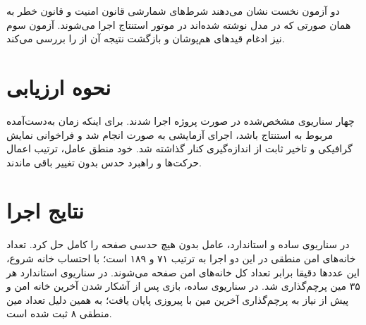 \documentclass[10.5pt]{exam}
\begin{document}
دو آزمون نخست نشان می‌دهند شرط‌های شمارشی قانون امنیت و قانون خطر به همان صورتی که در مدل نوشته شده‌اند در موتور استنتاج اجرا می‌شوند. آزمون سوم نیز ادغام قیدهای هم‌پوشان و بازگشت نتیجه آن از
را بررسی می‌کند.

\section{نحوه ارزیابی}
چهار سناریوی مشخص‌شده در صورت پروژه اجرا شدند. برای اینکه زمان به‌دست‌آمده مربوط به استنتاج باشد، اجرای آزمایشی به صورت
انجام شد و فراخوانی نمایش گرافیکی و تاخیر ثابت
از اندازه‌گیری کنار گذاشته شد. خود منطق عامل، ترتیب اعمال حرکت‌ها و راهبرد حدس بدون تغییر باقی ماندند.

\section{نتایج اجرا}
\begin{center}
    \renewcommand{\arraystretch}{1.35}
    \small
\end{center}

در سناریوی ساده و استاندارد، عامل بدون هیچ حدسی صفحه را کامل حل کرد. تعداد خانه‌های امن منطقی در این دو اجرا به ترتیب ۷۱ و ۱۸۹ است؛ با احتساب خانه شروع، این عددها دقیقا برابر تعداد کل خانه‌های امن صفحه می‌شوند. در سناریوی استاندارد هر ۳۵ مین پرچم‌گذاری شد. در سناریوی ساده، بازی پس از آشکار شدن آخرین خانه امن و پیش از نیاز به پرچم‌گذاری آخرین مین با پیروزی پایان یافت؛ به همین دلیل تعداد مین منطقی ۸ ثبت شده است.
\end{document}
